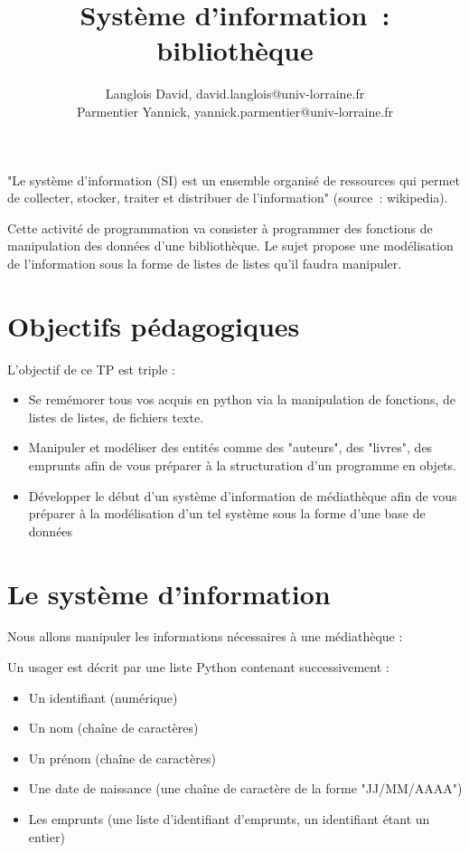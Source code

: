 \documentclass[10pt,a4paper,onecolumn]{article}
\begin{document}
\title{Système d'information~: bibliothèque}

\author{Langlois David, david.langlois@univ-lorraine.fr\\Parmentier Yannick, yannick.parmentier@univ-lorraine.fr}

\maketitle

"Le système d'information (SI) est un ensemble organisé de ressources qui permet de collecter, stocker, traiter et distribuer de l'information" (source~: wikipedia).

Cette activité de programmation va consister à programmer des fonctions de manipulation des données d'une bibliothèque. Le sujet propose une modélisation de l'information sous la forme de listes de listes qu'il faudra manipuler.

\section{Objectifs pédagogiques}

L'objectif de ce TP est triple :

\begin{itemize}
\item Se remémorer tous vos acquis en python via la manipulation de fonctions, de listes de listes, de fichiers texte.
\item Manipuler et modéliser des entités comme des "auteurs", des "livres", des emprunts afin de vous préparer à la structuration d'un programme en objets.
\item Développer le début d'un système d'information de médiathèque afin de vous préparer à la modélisation d'un tel système sous la forme d'une base de données
\end{itemize}

\section{Le système d'information}

Nous allons manipuler les informations nécessaires à une médiathèque :

Un usager est décrit par une liste Python contenant successivement : 

\begin{itemize}
\item Un identifiant (numérique)
\item Un nom (chaîne de caractères)
\item Un prénom (chaîne de caractères)
\item Une date de naissance (une chaîne de caractère de la forme "JJ/MM/AAAA")
\item Les emprunts (une liste d'identifiant d'emprunts, un identifiant étant un entier)
\end{itemize}
\end{document}
